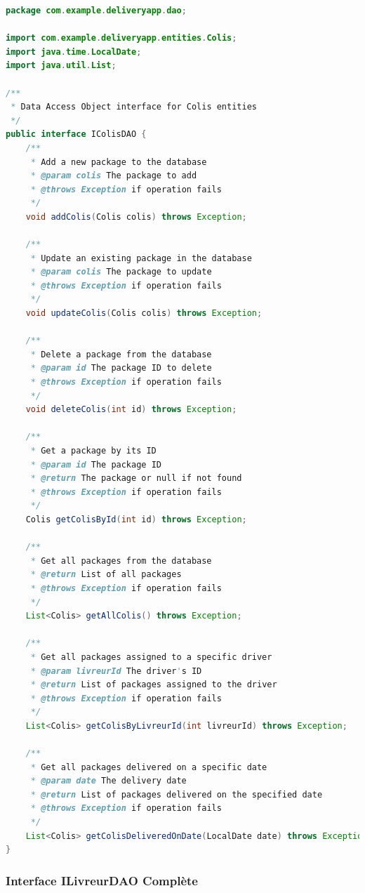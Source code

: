 \documentclass{rapportENSIAS}
\begin{document}
\begin{lstlisting}[language=Java, caption=Interface IColisDAO compl\`{e}te]
package com.example.deliveryapp.dao;

import com.example.deliveryapp.entities.Colis;
import java.time.LocalDate;
import java.util.List;

/**
 * Data Access Object interface for Colis entities
 */
public interface IColisDAO {
    /**
     * Add a new package to the database
     * @param colis The package to add
     * @throws Exception if operation fails
     */
    void addColis(Colis colis) throws Exception;
    
    /**
     * Update an existing package in the database
     * @param colis The package to update
     * @throws Exception if operation fails
     */
    void updateColis(Colis colis) throws Exception;
    
    /**
     * Delete a package from the database
     * @param id The package ID to delete
     * @throws Exception if operation fails
     */
    void deleteColis(int id) throws Exception;
    
    /**
     * Get a package by its ID
     * @param id The package ID
     * @return The package or null if not found
     * @throws Exception if operation fails
     */
    Colis getColisById(int id) throws Exception;
    
    /**
     * Get all packages from the database
     * @return List of all packages
     * @throws Exception if operation fails
     */
    List<Colis> getAllColis() throws Exception;
    
    /**
     * Get all packages assigned to a specific driver
     * @param livreurId The driver's ID
     * @return List of packages assigned to the driver
     * @throws Exception if operation fails
     */
    List<Colis> getColisByLivreurId(int livreurId) throws Exception;
    
    /**
     * Get all packages delivered on a specific date
     * @param date The delivery date
     * @return List of packages delivered on the specified date
     * @throws Exception if operation fails
     */
    List<Colis> getColisDeliveredOnDate(LocalDate date) throws Exception;
}
\end{lstlisting}

\subsubsection{Interface ILivreurDAO Compl\`{e}te}
\end{document}
